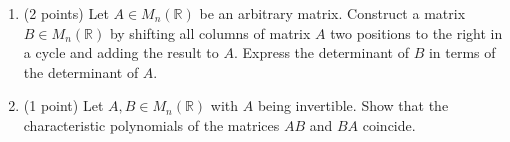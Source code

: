 \documentclass{article}
\begin{document}
\begin{enumerate}
  \item (2 points) Let $A \in M_n(\mathbb{R})$ be an arbitrary matrix. 
  Construct a matrix $B \in M_n(\mathbb{R})$ by shifting all columns of matrix $A$ 
  two positions to the right in a cycle and adding the result to $A$. 
  Express the determinant of $B$ in terms of the determinant of $A$.

  \item (1 point) Let $A, B \in M_n(\mathbb{R})$ with $A$ being invertible. 
  Show that the characteristic polynomials of the matrices $AB$ and $BA$ coincide.
\end{enumerate}
\end{document}
